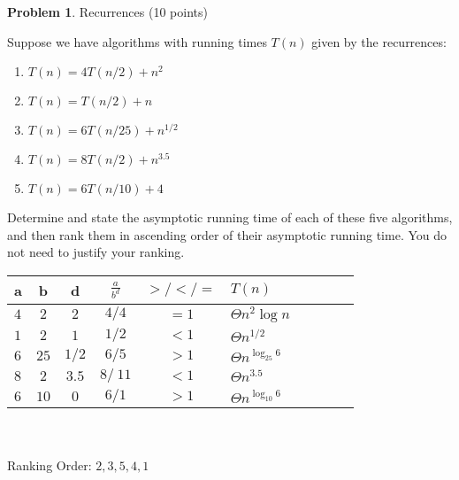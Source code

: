 \documentclass[11pt]{article}
\theoremstyle{definition}
\theoremstyle{theorem}
\newtheorem{prob}{Problem}
\newcommand{\solution}{\medskip\noindent{\color{DarkBlue}\textbf{Solution:}}}
\begin{document}
\newpage
\begin{prob} Recurrences (10 points) \end{prob}
Suppose we have algorithms with running times $T(n)$ given by the recurrences:
\begin{enumerate}
\item $T(n) = 4T(n/2) + n^2$
\item $T(n) = T(n/2) + n$
\item $T(n) = 6T(n/25) + n^{1/2}$
\item $T(n) = 8T(n/2) + n^{3.5}$
\item $T(n) = 6T(n/10) + 4$
\end{enumerate}


Determine and state the asymptotic running time of each of these five algorithms, and then rank them in ascending order of their asymptotic running time.  You do not need to justify your ranking.

\solution

\begin{tabular}{|l|c|c|c|clclcl}
\hline
 a & b & d & $\frac{a}{b^d}$  & $>/</=$ & $T(n)$ \\
\hline
$4$ & $2$ & $2$ & $4/4$  & $= 1$ & $\Theta{n^2 \log n}$ \\
$1$ & $2$ & $1$ & $1/2$  & $< 1$ & $\Theta{n^{1/2}}$  \\
$6$ & $25$ & $1/2$ & $6/5$  & $> 1$ & $\Theta{n^{\log_{25} 6}}$\\
$8$ & $2$ & $3.5$ & $8/~11$  & $< 1$ & $\Theta{n^{3.5}}$ \\
$6$ & $10$ & $0$ & $6/1$   & $> 1$ & $\Theta{n^{\log_{10}6}}$  \\
\hline
\end{tabular}
\\\\
Ranking Order: $2, 3, 5, 4, 1$
\end{document}
